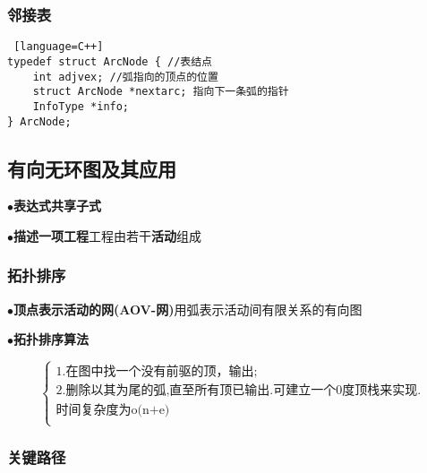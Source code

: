 \documentclass[UTF8]{article}
\newcommand{\keypoint}[2]{$\bullet$\textbf{#1}\quad#2\par}
\newcommand{\points}[1]{
	$$ \left\{ 
	\begin{array}{l}
	#1
	\end{array}
	\right.
	$$
}
\begin{document}
\subsubsection{邻接表}
\begin{lstlisting} [language=C++]
typedef struct ArcNode { //表结点
	int adjvex; //弧指向的顶点的位置
	struct ArcNode *nextarc; 指向下一条弧的指针
	InfoType *info;
} ArcNode;
\end{lstlisting}

\subsection{有向无环图及其应用}
\keypoint{表达式共享子式}{}
\keypoint{描述一项工程}{工程由若干\textbf{活动}组成}
\subsubsection{拓扑排序}
\keypoint{顶点表示活动的网(AOV-网)}{用弧表示活动间有限关系的有向图}
\keypoint{拓扑排序算法}{
	\points{
		\mbox{1.在图中找一个没有前驱的顶，输出;}\\
		\mbox{2.删除以其为尾的弧,直至所有顶已输出.可建立一个0度顶栈来实现.}\\
		\mbox{时间复杂度为o(n+e)}\\
	}
}
\subsubsection{关键路径}



	
	
	
	
\end{document}
